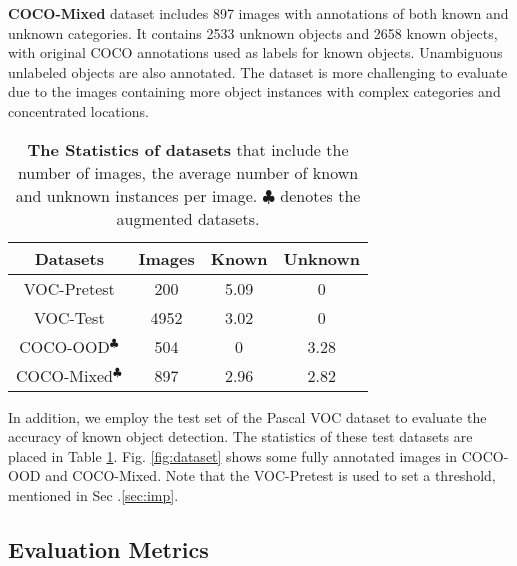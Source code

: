\documentclass[10pt,twocolumn,letterpaper]{article}
\newcommand{\xf}[1]{{\color{black} #1}}
\begin{document}
\noindent\textbf{COCO-Mixed} dataset includes 897 images with annotations of both known and unknown categories. 
It contains 2533 unknown objects and 2658 known objects, with original COCO annotations used as labels for known objects. 
Unambiguous unlabeled objects are also annotated. 
The dataset is more challenging to evaluate due to the images containing more object instances with complex categories and concentrated locations.


\begin{table}[t!]
\centering
\begin{tabular}{c|c|c c}
\toprule
Datasets               & Images & Known        & Unknown\\ \midrule
VOC-Pretest            & 200    & 5.09         & 0      \\
VOC-Test               & 4952   & 3.02         & 0      \\
COCO-OOD$^\clubsuit$   & 504    & 0            & 3.28   \\ 
COCO-Mixed$^\clubsuit$ & 897    & 2.96         & 2.82   \\\bottomrule
\end{tabular}
\caption{\textbf{The Statistics of datasets} \xf{that include} the number of images, the average number of known and unknown instances per image.
$\clubsuit$ denotes the augmented datasets.}
\vspace{-7pt}
\label{tab:datasets}
\end{table}



In addition, we employ the test set of the Pascal VOC dataset to evaluate the accuracy of known object detection.
The statistics of these test datasets are placed in Table \ref{tab:datasets}. Fig. \ref{fig:dataset} shows some fully annotated images in COCO-OOD and COCO-Mixed.
Note that the VOC-Pretest is used to set a threshold,
mentioned in Sec .\ref{sec:imp}.

\subsection{Evaluation Metrics}
\end{document}
